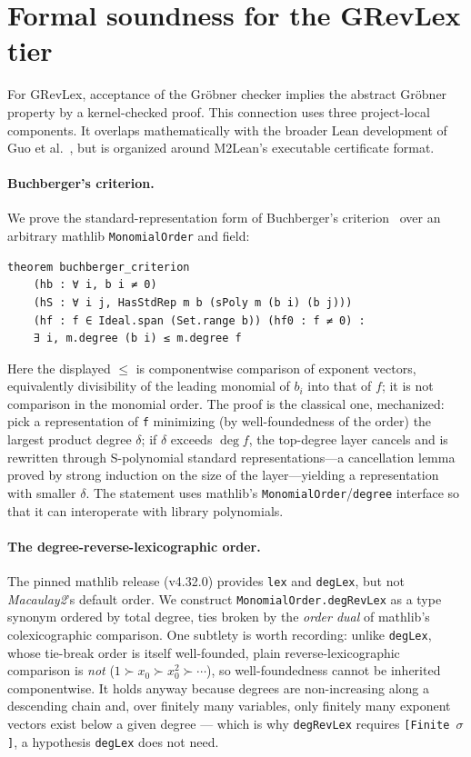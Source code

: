 \documentclass[11pt]{article}
\newcommand{\M}{\textit{Macaulay2}}
\newcommand{\mathlib}{\textsf{mathlib}}
\newcommand{\code}[1]{\texttt{#1}}
\begin{document}
\section{Formal soundness for the GRevLex tier}\label{sec:groebner}

For GRevLex, acceptance of the Gr\"obner checker implies the abstract
Gr\"obner property by a kernel-checked proof.  This connection uses
three project-local components.  It overlaps mathematically with the
broader Lean development of Guo et al.~\cite{guo-groebner-lean}, but is
organized around M2Lean's executable certificate format.

\paragraph{Buchberger's criterion.}
We prove the standard-representation form of Buchberger's
criterion~\cite{buchberger,becker-weispfenning} over an arbitrary
\mathlib{} \code{MonomialOrder} and field:

\begin{lstlisting}[style=leanstyle]
theorem buchberger_criterion
    (hb : ∀ i, b i ≠ 0)
    (hS : ∀ i j, HasStdRep m b (sPoly m (b i) (b j)))
    (hf : f ∈ Ideal.span (Set.range b)) (hf0 : f ≠ 0) :
    ∃ i, m.degree (b i) ≤ m.degree f
\end{lstlisting}

\noindent
Here the displayed $\le$ is componentwise comparison of exponent
vectors, equivalently divisibility of the leading monomial of $b_i$
into that of $f$; it is not comparison in the monomial order.
The proof is the classical one, mechanized: pick a representation of
\code{f} minimizing (by well-foundedness of the order) the largest product
degree $\delta$; if $\delta$ exceeds $\deg f$, the top-degree layer
cancels and is rewritten through S-polynomial standard
representations---a cancellation lemma proved by strong induction on
the size of the layer---yielding a representation with smaller
$\delta$.  The statement uses \mathlib{}'s
\code{MonomialOrder}/\code{degree} interface so that it can interoperate
with library polynomials.

\paragraph{The degree-reverse-lexicographic order.}
The pinned \mathlib{} release (v4.32.0) provides \code{lex} and
\code{degLex}, but not \M{}'s default order.  We construct
\code{MonomialOrder.degRevLex} as a type
synonym ordered by total degree, ties broken by the \emph{order dual}
of \mathlib{}'s colexicographic comparison.  One subtlety is worth
recording: unlike \code{degLex}, whose tie-break order is itself
well-founded, plain reverse-lexicographic comparison is \emph{not}
($1 \succ x_0 \succ x_0^2 \succ \cdots$), so well-foundedness cannot
be inherited componentwise.  It holds anyway because degrees are
non-increasing along a descending chain and, over finitely many
variables, only finitely many exponent vectors exist below a given
degree --- which is why \code{degRevLex} requires \code{[Finite\,$\sigma$]},
a hypothesis \code{degLex} does not need.
\end{document}
